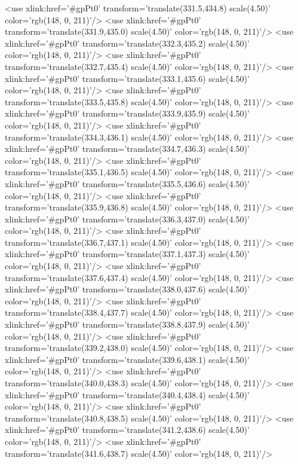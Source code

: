 	<use xlink:href='#gpPt0' transform='translate(331.5,434.8) scale(4.50)' color='rgb(148,   0, 211)'/>
	<use xlink:href='#gpPt0' transform='translate(331.9,435.0) scale(4.50)' color='rgb(148,   0, 211)'/>
	<use xlink:href='#gpPt0' transform='translate(332.3,435.2) scale(4.50)' color='rgb(148,   0, 211)'/>
	<use xlink:href='#gpPt0' transform='translate(332.7,435.4) scale(4.50)' color='rgb(148,   0, 211)'/>
	<use xlink:href='#gpPt0' transform='translate(333.1,435.6) scale(4.50)' color='rgb(148,   0, 211)'/>
	<use xlink:href='#gpPt0' transform='translate(333.5,435.8) scale(4.50)' color='rgb(148,   0, 211)'/>
	<use xlink:href='#gpPt0' transform='translate(333.9,435.9) scale(4.50)' color='rgb(148,   0, 211)'/>
	<use xlink:href='#gpPt0' transform='translate(334.3,436.1) scale(4.50)' color='rgb(148,   0, 211)'/>
	<use xlink:href='#gpPt0' transform='translate(334.7,436.3) scale(4.50)' color='rgb(148,   0, 211)'/>
	<use xlink:href='#gpPt0' transform='translate(335.1,436.5) scale(4.50)' color='rgb(148,   0, 211)'/>
	<use xlink:href='#gpPt0' transform='translate(335.5,436.6) scale(4.50)' color='rgb(148,   0, 211)'/>
	<use xlink:href='#gpPt0' transform='translate(335.9,436.8) scale(4.50)' color='rgb(148,   0, 211)'/>
	<use xlink:href='#gpPt0' transform='translate(336.3,437.0) scale(4.50)' color='rgb(148,   0, 211)'/>
	<use xlink:href='#gpPt0' transform='translate(336.7,437.1) scale(4.50)' color='rgb(148,   0, 211)'/>
	<use xlink:href='#gpPt0' transform='translate(337.1,437.3) scale(4.50)' color='rgb(148,   0, 211)'/>
	<use xlink:href='#gpPt0' transform='translate(337.6,437.4) scale(4.50)' color='rgb(148,   0, 211)'/>
	<use xlink:href='#gpPt0' transform='translate(338.0,437.6) scale(4.50)' color='rgb(148,   0, 211)'/>
	<use xlink:href='#gpPt0' transform='translate(338.4,437.7) scale(4.50)' color='rgb(148,   0, 211)'/>
	<use xlink:href='#gpPt0' transform='translate(338.8,437.9) scale(4.50)' color='rgb(148,   0, 211)'/>
	<use xlink:href='#gpPt0' transform='translate(339.2,438.0) scale(4.50)' color='rgb(148,   0, 211)'/>
	<use xlink:href='#gpPt0' transform='translate(339.6,438.1) scale(4.50)' color='rgb(148,   0, 211)'/>
	<use xlink:href='#gpPt0' transform='translate(340.0,438.3) scale(4.50)' color='rgb(148,   0, 211)'/>
	<use xlink:href='#gpPt0' transform='translate(340.4,438.4) scale(4.50)' color='rgb(148,   0, 211)'/>
	<use xlink:href='#gpPt0' transform='translate(340.8,438.5) scale(4.50)' color='rgb(148,   0, 211)'/>
	<use xlink:href='#gpPt0' transform='translate(341.2,438.6) scale(4.50)' color='rgb(148,   0, 211)'/>
	<use xlink:href='#gpPt0' transform='translate(341.6,438.7) scale(4.50)' color='rgb(148,   0, 211)'/>
